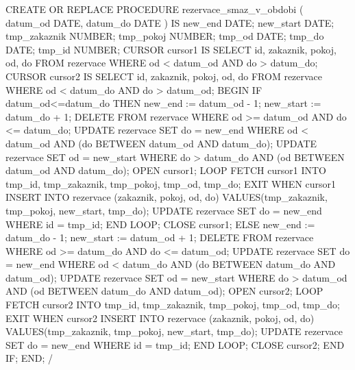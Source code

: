 \documentclass[8pt,a4paper]{article}
\begin{document}
\begin{center}
\begin{boxedverbatim}
CREATE OR REPLACE PROCEDURE rezervace_smaz_v_obdobi (
  datum_od DATE, datum_do DATE ) IS
new_end DATE;
new_start DATE;
tmp_zakaznik NUMBER;
tmp_pokoj NUMBER;
tmp_od DATE;
tmp_do DATE;
tmp_id NUMBER;
CURSOR cursor1 IS
        SELECT id, zakaznik, pokoj, od, do
        FROM rezervace WHERE od < datum_od AND do > datum_do;
CURSOR cursor2 IS
        SELECT id, zakaznik, pokoj, od, do
        FROM rezervace WHERE od < datum_do AND do > datum_od;
BEGIN
IF datum_od<=datum_do THEN
    new_end := datum_od - 1;
    new_start := datum_do + 1;
    DELETE FROM rezervace WHERE od >= datum_od AND do <= datum_do;
    UPDATE rezervace SET do = new_end
        WHERE od < datum_od AND (do BETWEEN datum_od AND datum_do);
    UPDATE rezervace SET od = new_start
        WHERE do > datum_do AND (od BETWEEN datum_od AND datum_do);
    OPEN cursor1;
    LOOP
        FETCH cursor1 INTO tmp_id, tmp_zakaznik, tmp_pokoj, tmp_od, tmp_do;
        EXIT WHEN cursor1%
        INSERT INTO rezervace (zakaznik, pokoj, od, do)
            VALUES(tmp_zakaznik, tmp_pokoj, new_start, tmp_do);
        UPDATE rezervace
            SET do = new_end WHERE id = tmp_id;
    END LOOP;
    CLOSE cursor1;
ELSE
    new_end := datum_do - 1;
    new_start := datum_od + 1;        
    DELETE FROM rezervace WHERE od >= datum_do AND do <= datum_od;
    UPDATE rezervace SET do = new_end
        WHERE od < datum_do AND (do BETWEEN datum_do AND datum_od);
    UPDATE rezervace SET od = new_start
        WHERE do > datum_od AND (od BETWEEN datum_do AND datum_od);
    OPEN cursor2;
    LOOP
        FETCH cursor2 INTO tmp_id, tmp_zakaznik, tmp_pokoj, tmp_od, tmp_do;
        EXIT WHEN cursor2%
        INSERT INTO rezervace (zakaznik, pokoj, od, do)
            VALUES(tmp_zakaznik, tmp_pokoj, new_start, tmp_do);
        UPDATE rezervace SET do = new_end WHERE id = tmp_id;
    END LOOP;
    CLOSE cursor2;
END IF;
END;
/
\end{boxedverbatim}
\end{center}
\end{document}
